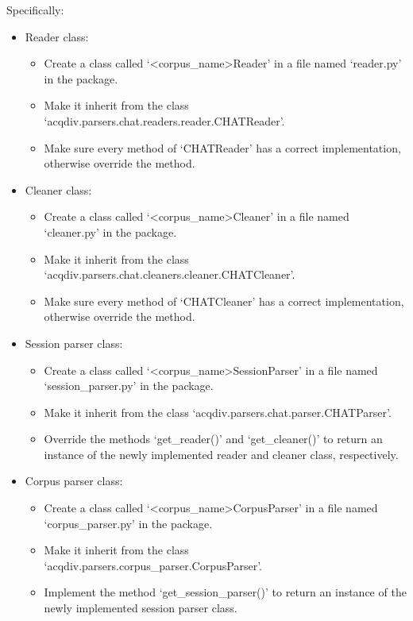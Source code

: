 \documentclass[a4paper, 11pt]{book}
\begin{document}
\noindent Specifically:

\begin{itemize}
\item Reader class:
	\begin{itemize}
	\item Create a class called `<corpus\_name>Reader' in a file named `reader.py' in the package.
	\item Make it inherit from the class `acqdiv.parsers.chat.readers.reader.CHATReader'.
	\item Make sure every method of `CHATReader' has a correct implementation, otherwise override the method.
	\end{itemize}
\item Cleaner class:
	\begin{itemize}
	\item Create a class called `<corpus\_name>Cleaner' in a file named  `cleaner.py' in the package.
	\item Make it inherit from the class `acqdiv.parsers.chat.cleaners.cleaner.CHATCleaner'.
	\item Make sure every method of `CHATCleaner' has a correct implementation, otherwise override the method.
	\end{itemize}
\item Session parser class:
	\begin{itemize}
	\item Create a class called `<corpus\_name>SessionParser' in a file named `session\_parser.py' in the package.
	\item Make it inherit from the class `acqdiv.parsers.chat.parser.CHATParser'.
	\item Override the methods `get\_reader()' and `get\_cleaner()' to return an instance of the newly implemented reader and cleaner class, respectively.
	\end{itemize}
\item Corpus parser class:
	\begin{itemize}
	\item Create a class called `<corpus\_name>CorpusParser' in a file named `corpus\_parser.py' in the package.
	\item Make it inherit from the class `acqdiv.parsers.corpus\_parser.CorpusParser'.
	\item Implement the method `get\_session\_parser()' to return an instance of the newly implemented session parser class.
	\end{itemize}
\end{itemize}
\end{document}
